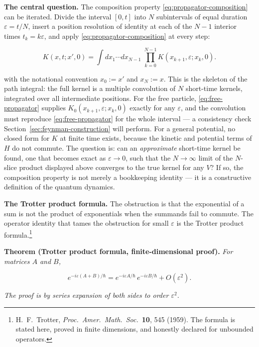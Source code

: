 \medskip\noindent\textbf{The central question.} The composition property \eqref{eq:propagator-composition} can be iterated. Divide the interval $[0,t]$ into $N$ subintervals of equal duration $\varepsilon = t/N$, insert a position resolution of identity at each of the $N-1$ interior times $t_k = k\varepsilon$, and apply \eqref{eq:propagator-composition} at every step:
\begin{linenomath}
\begin{equation}
K(x,t;x',0) = \int dx_1\cdots dx_{N-1}\; \prod_{k=0}^{N-1} K(x_{k+1},\varepsilon; x_k,0) .
\end{equation}
\end{linenomath}
with the notational convention $x_0 := x'$ and $x_N := x$. This is the skeleton of the path integral: the full kernel is a multiple convolution of $N$ short-time kernels, integrated over all intermediate positions. For the free particle, \eqref{eq:free-propagator} supplies $K_0(x_{k+1},\varepsilon;x_k,0)$ exactly for any $\varepsilon$, and the convolution must reproduce \eqref{eq:free-propagator} for the whole interval --- a consistency check Section~\ref{sec:feynman-construction} will perform. For a general potential, no closed form for $K$ at finite time exists, because the kinetic and potential terms of $H$ do not commute. The question is: can an \emph{approximate} short-time kernel be found, one that becomes exact as $\varepsilon \to 0$, such that the $N \to \infty$ limit of the $N$-slice product displayed above converges to the true kernel for any $V$? If so, the composition property is not merely a bookkeeping identity --- it is a constructive definition of the quantum dynamics.

\medskip\noindent\textbf{The Trotter product formula.} The obstruction is that the exponential of a sum is not the product of exponentials when the summands fail to commute. The operator identity that tames the obstruction for small $\varepsilon$ is the Trotter product formula.\footnote{H.~F.~Trotter, \emph{Proc.~Amer.~Math.~Soc.}~\textbf{10}, 545 (1959). The formula is stated here, proved in finite dimensions, and honestly declared for unbounded operators.}

\medskip\noindent\textbf{Theorem (Trotter product formula, finite-dimensional proof).} \emph{For matrices $A$ and $B$,}
\begin{linenomath}
\begin{equation}
e^{-i\varepsilon(A+B)/\hbar} = e^{-i\varepsilon A/\hbar}\,e^{-i\varepsilon B/\hbar} + O(\varepsilon^2) .
\label{eq:trotter-factorization}
\end{equation}
\end{linenomath}
\emph{The proof is by series expansion of both sides to order $\varepsilon^2$.}

